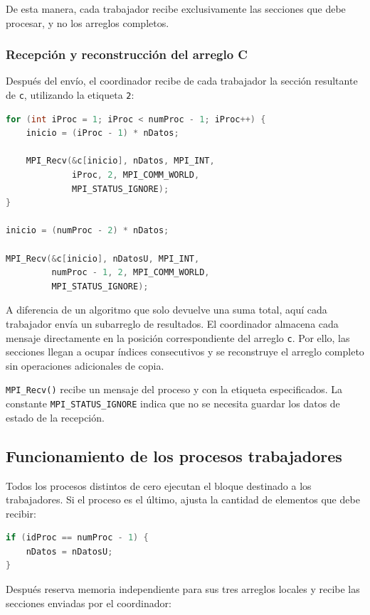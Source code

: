 \documentclass[12pt,a4paper]{article}
\begin{document}
De esta manera, cada trabajador recibe exclusivamente las secciones que debe
procesar, y no los arreglos completos.

\subsubsection{Recepción y reconstrucción del arreglo C}

Después del envío, el coordinador recibe de cada trabajador la sección
resultante de \texttt{c}, utilizando la etiqueta \texttt{2}:

\begin{lstlisting}[language=C]
for (int iProc = 1; iProc < numProc - 1; iProc++) {
    inicio = (iProc - 1) * nDatos;

    MPI_Recv(&c[inicio], nDatos, MPI_INT,
             iProc, 2, MPI_COMM_WORLD,
             MPI_STATUS_IGNORE);
}

inicio = (numProc - 2) * nDatos;

MPI_Recv(&c[inicio], nDatosU, MPI_INT,
         numProc - 1, 2, MPI_COMM_WORLD,
         MPI_STATUS_IGNORE);
\end{lstlisting}

A diferencia de un algoritmo que solo devuelve una suma total, aquí cada
trabajador envía un subarreglo de resultados. El coordinador almacena cada
mensaje directamente en la posición correspondiente del arreglo \texttt{c}.
Por ello, las secciones llegan a ocupar índices consecutivos y se reconstruye
el arreglo completo sin operaciones adicionales de copia.

\texttt{MPI\_Recv()} recibe un mensaje del proceso y con la etiqueta
especificados. La constante \texttt{MPI\_STATUS\_IGNORE} indica que no se
necesita guardar los datos de estado de la recepción.

\subsection{Funcionamiento de los procesos trabajadores}

Todos los procesos distintos de cero ejecutan el bloque destinado a los
trabajadores. Si el proceso es el último, ajusta la cantidad de elementos que
debe recibir:

\begin{lstlisting}[language=C]
if (idProc == numProc - 1) {
    nDatos = nDatosU;
}
\end{lstlisting}

Después reserva memoria independiente para sus tres arreglos locales y
recibe las secciones enviadas por el coordinador:
\end{document}
